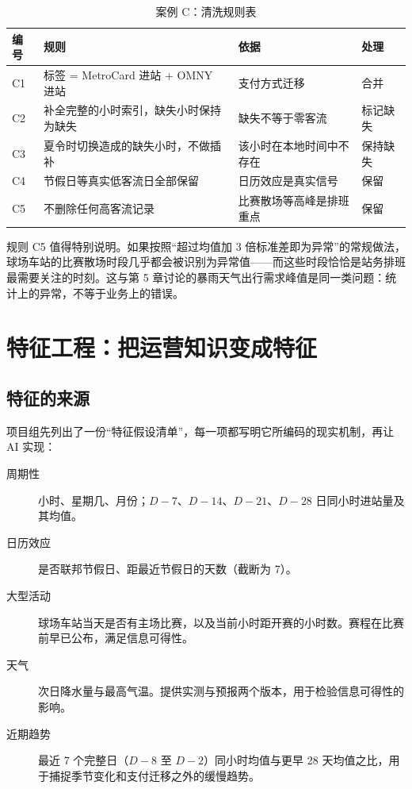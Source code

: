 \begin{table}[H]
\centering
\caption{案例 C：清洗规则表}
\label{tab:ch16_cleaning}
\small
\begin{tabular}{p{0.6cm}p{5.6cm}p{3.6cm}p{2.4cm}}
\toprule
编号 & 规则 & 依据 & 处理 \\
\midrule
C1 & 标签 = MetroCard 进站 + OMNY 进站 & 支付方式迁移 & 合并 \\
C2 & 补全完整的小时索引，缺失小时保持为缺失 & 缺失不等于零客流 & 标记缺失 \\
C3 & 夏令时切换造成的缺失小时，不做插补 & 该小时在本地时间中不存在 & 保持缺失 \\
C4 & 节假日等真实低客流日全部保留 & 日历效应是真实信号 & 保留 \\
C5 & 不删除任何高客流记录 & 比赛散场等高峰是排班重点 & 保留 \\
\bottomrule
\end{tabular}
\end{table}

规则 C5 值得特别说明。如果按照“超过均值加 3 倍标准差即为异常”的常规做法，球场车站的比赛散场时段几乎都会被识别为异常值——而这些时段恰恰是站务排班最需要关注的时刻。这与第 5 章讨论的暴雨天气出行需求峰值是同一类问题：统计上的异常，不等于业务上的错误。

\section{特征工程：把运营知识变成特征}

\subsection{特征的来源}

项目组先列出了一份“特征假设清单”，每一项都写明它所编码的现实机制，再让 AI 实现：

\begin{description}
  \item[周期性] 小时、星期几、月份；$D-7$、$D-14$、$D-21$、$D-28$ 日同小时进站量及其均值。
  \item[日历效应] 是否联邦节假日、距最近节假日的天数（截断为 7）。
  \item[大型活动] 球场车站当天是否有主场比赛，以及当前小时距开赛的小时数。赛程在比赛前早已公布，满足信息可得性。
  \item[天气] 次日降水量与最高气温。提供实测与预报两个版本，用于检验信息可得性的影响。
  \item[近期趋势] 最近 7 个完整日（$D-8$ 至 $D-2$）同小时均值与更早 28 天均值之比，用于捕捉季节变化和支付迁移之外的缓慢趋势。
\end{description}

